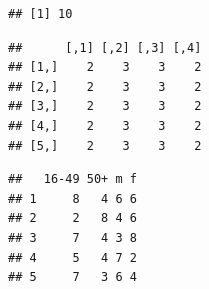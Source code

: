 \begin{Shaded}
\begin{Highlighting}[]
\NormalTok{(}\NormalTok{(}\NormalTok{), } \NormalTok{(}\NormalTok{)))}

\NormalTok{USd.cat[}\NormalTok{), }\NormalTok{] <- }
\NormalTok{USd.cat[}\NormalTok{), }\NormalTok{] <- }
\NormalTok{USd.cat[}\NormalTok{), }\NormalTok{] <- }
\NormalTok{USd.cat[}\NormalTok{), }\NormalTok{] <- }
\end{Highlighting}
\end{Shaded}
\begin{verbatim}
## [1] 10
\end{verbatim}
\begin{Shaded}
\begin{Highlighting}[]

\NormalTok{:}
\NormalTok{\}}

\end{Highlighting}
\end{Shaded}
\begin{verbatim}
##      [,1] [,2] [,3] [,4]
## [1,]    2    3    3    2
## [2,]    2    3    3    2
## [3,]    2    3    3    2
## [4,]    2    3    3    2
## [5,]    2    3    3    2
\end{verbatim}
\begin{Shaded}
\begin{Highlighting}[]
\end{Highlighting}
\end{Shaded}
\begin{verbatim}
##   16-49 50+ m f
## 1     8   4 6 6
## 2     2   8 4 6
## 3     7   4 3 8
## 4     5   4 7 2
## 5     7   3 6 4
\end{verbatim}
